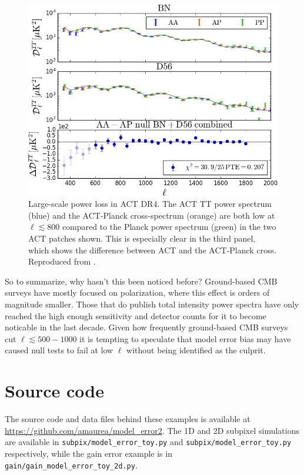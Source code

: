 \documentclass[twocolumn,apj]{aastex63}
\begin{document}
\begin{figure}[ht]
	\centering
	\includegraphics[width=\columnwidth]{act_dr4_tf.png}
	\caption{Large-scale power loss in ACT DR4. The ACT TT power spectrum (blue)
	and the ACT-Planck cross-spectrum (orange) are both low at $\ell \lesssim 800$
	compared to the Planck power spectrum (green) in the two ACT patches shown.
	This is especially clear in the third panel, which shows the difference between
	ACT and the ACT-Planck cross. Reproduced from \citet{choi/etal:2020}.}
	\label{fig:act-dr4-tf}
\end{figure}

So to summarize, why hasn't this been noticed before? Ground-based CMB surveys
have mostly focused on polarization, where this effect is orders of magnitude
smaller. Those that do publish total intensity power spectra
have only reached the high enough sensitivity and detector counts for it to
become noticable in the last decade. Given how frequently ground-based CMB
surveys cut $\ell \lesssim 500-1000$ it is tempting to speculate that model error
bias may have caused null tests to fail at low $\ell$ without being
identified as the culprit.

\section{Source code}
\label{sec:code}
The source code and data files behind these examples is available at
\url{https://github.com/amaurea/model_error2}. The 1D and 2D subpixel
simulations are available in \verb|subpix/model_error_toy.py| and \verb|subpix/model_error_toy.py|
respectively, while the gain error example is in
\verb|gain/gain_model_error_toy_2d.py|.
\end{document}
